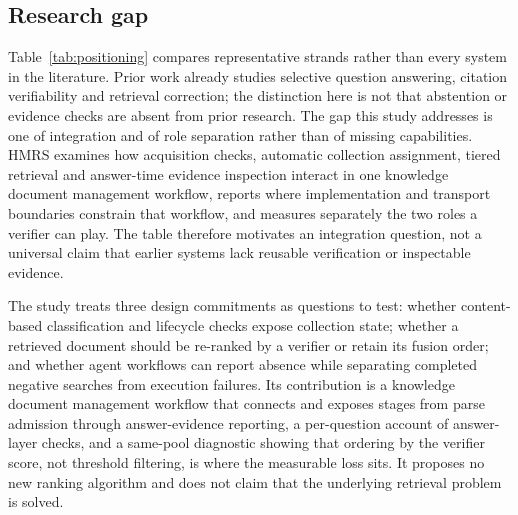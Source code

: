 \subsection{Research gap}
\label{sec:gap}

Table~\ref{tab:positioning} compares representative strands rather than every
system in the literature. Prior work already studies selective question
answering, citation verifiability and retrieval correction; the distinction
here is not that abstention or evidence checks are absent from prior research.
The gap this study addresses is one of integration and of role separation
rather than of missing capabilities. HMRS examines how acquisition checks,
automatic collection assignment, tiered retrieval and answer-time evidence
inspection interact in one knowledge document management workflow, reports
where implementation and transport boundaries constrain that workflow, and
measures separately the two roles a verifier can play. The table therefore motivates an
integration question, not a universal claim that earlier systems lack reusable
verification or inspectable evidence.

The study treats three design commitments as questions to test: whether
content-based classification and lifecycle checks expose collection state;
whether a retrieved document should be re-ranked by a verifier or retain its
fusion order; and whether agent workflows can report absence while separating
completed negative searches from execution failures. Its contribution is a
knowledge document management workflow that connects and exposes stages from
parse admission through answer-evidence reporting, a per-question account of
answer-layer checks, and a same-pool diagnostic showing that ordering by the
verifier score, not threshold filtering, is where the measurable loss sits. It
proposes no new ranking algorithm and does not claim that the underlying
retrieval problem is solved.

